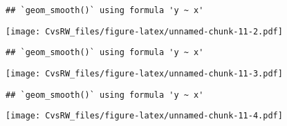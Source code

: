 \documentclass[
]{article}
\newenvironment{Shaded}{\begin{snugshade}}{\end{snugshade}}
\newcommand{\DataTypeTok}[1]{\textcolor[rgb]{0.13,0.29,0.53}{#1}}
\newcommand{\KeywordTok}[1]{\textcolor[rgb]{0.13,0.29,0.53}{\textbf{#1}}}
\newcommand{\NormalTok}[1]{#1}
\newcommand{\OperatorTok}[1]{\textcolor[rgb]{0.81,0.36,0.00}{\textbf{#1}}}
\newcommand{\OtherTok}[1]{\textcolor[rgb]{0.56,0.35,0.01}{#1}}
\newcommand{\StringTok}[1]{\textcolor[rgb]{0.31,0.60,0.02}{#1}}
\begin{document}
\begin{verbatim}
## `geom_smooth()` using formula 'y ~ x'
\end{verbatim}

\texttt{[image: CvsRW\_files/figure-latex/unnamed-chunk-11-2.pdf]}

\begin{Shaded}
\end{Shaded}

\begin{verbatim}
## `geom_smooth()` using formula 'y ~ x'
\end{verbatim}

\texttt{[image: CvsRW\_files/figure-latex/unnamed-chunk-11-3.pdf]}

\begin{Shaded}
\end{Shaded}

\begin{verbatim}
## `geom_smooth()` using formula 'y ~ x'
\end{verbatim}

\texttt{[image: CvsRW\_files/figure-latex/unnamed-chunk-11-4.pdf]}

\begin{Shaded}
\end{Shaded}
\end{document}
